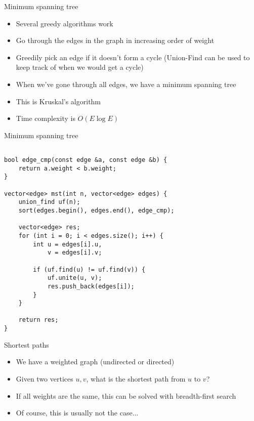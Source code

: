 \documentclass[10pt]{beamer}
\newcommand{\bi}{\begin{itemize}}
\newcommand{\ei}{\end{itemize}}
\begin{document}
\begin{frame}{Minimum spanning tree}
    \bi
        \item Several greedy algorithms work
        \vspace{10pt}
        \item Go through the edges in the graph in increasing order of weight
        \item Greedily pick an edge if it doesn't form a cycle (Union-Find can be used to keep track of when we would get a cycle)
        \item When we've gone through all edges, we have a minimum spanning tree
        \vspace{10pt}
        \item This is Kruskal's algorithm
        \item Time complexity is $O(E \log E)$
    \ei
\end{frame}

\begin{frame}[fragile]{Minimum spanning tree}
    \begin{verbatim}

bool edge_cmp(const edge &a, const edge &b) {
    return a.weight < b.weight;
}

vector<edge> mst(int n, vector<edge> edges) {
    union_find uf(n);
    sort(edges.begin(), edges.end(), edge_cmp);

    vector<edge> res;
    for (int i = 0; i < edges.size(); i++) {
        int u = edges[i].u,
            v = edges[i].v;

        if (uf.find(u) != uf.find(v)) {
            uf.unite(u, v);
            res.push_back(edges[i]);
        }
    }

    return res;
}
    \end{verbatim}
\end{frame}


\begin{frame}{Shortest paths}
    \bi
        \item We have a weighted graph (undirected or directed)
        \item Given two vertices $u,v$, what is the shortest path from $u$ to $v$?
        \vspace{10pt}
        \item If all weights are the same, this can be solved with breadth-first search
        \item Of course, this is usually not the case...
    \ei
\end{frame}
\end{document}
